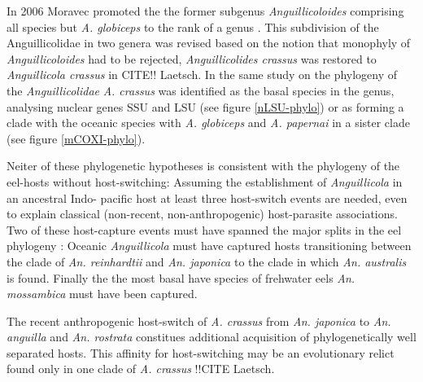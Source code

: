 In 2006 Moravec promoted the the former subgenus
\textit{Anguillicoloides} comprising all species but
\textit{A. globiceps} to the rank of a genus
\cite{moravec_anguillicoloides}. This subdivision of the
Anguillicolidae in two genera was revised based on the notion that
monophyly of \textit{Anguillicoloides} had to be rejected,
\textit{Anguillicolides crassus} was restored to \textit{Anguillicola
  crassus} in CITE!! Laetsch. In the same study on the phylogeny of
the \textit{Anguillicolidae} \textit{A. crassus} was identified as the
basal species in the genus, analysing nuclear genes SSU and LSU (see
figure \ref{nLSU-phylo}) or as forming a clade with the oceanic
species with \textit{A. globiceps} and \textit{A. papernai} in a
sister clade (see figure \ref{mCOXI-phylo}).



Neiter of these phylogenetic hypotheses is consistent with the
phylogeny of the eel-hosts without host-switching: Assuming the
establishment of \textit{Anguillicola} in an ancestral Indo- pacific
host at least three host-switch events are needed, even to explain
classical (non-recent, non-anthropogenic) host-parasite associations.
Two of these host-capture events must have spanned the major splits in
the eel phylogeny \cite{minegishi_molecular_2005}: Oceanic
\textit{Anguillicola} must have captured hosts transitioning between
the clade of \textit{An. reinhardtii} and \textit{An. japonica} to the
clade in which \textit{An. australis} is found. Finally the the most
basal have species of frehwater eels \textit{An. mossambica} must have
been captured.

The recent anthropogenic host-switch of \textit{A. crassus} from
\textit{An. japonica} to \textit{An. anguilla} and
\textit{An. rostrata} constitues additional acquisition of
phylogenetically well separated hosts. This affinity for
host-switching may be an evolutionary relict found only in one clade
of \textit{A. crassus} !!CITE Laetsch.

